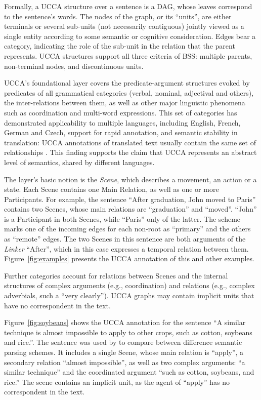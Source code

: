\documentclass[11pt]{article}
\newcommand{\figref}[1]{Figure~\ref{#1}}
\begin{document}
Formally, a UCCA structure over a sentence is a DAG, whose leaves correspond to the sentence's words.
The nodes of the graph, or its ``units'', are either terminals or several
sub-units (not necessarily contiguous) jointly viewed as a
single entity according to some semantic or cognitive consideration.
Edges bear a category, indicating the role of the sub-unit in the relation that the parent represents.
UCCA structures support all three criteria of BSS: multiple parents, non-terminal nodes, and
discontinuous units.

UCCA's foundational layer covers the predicate-argument
structures evoked by predicates of all grammatical categories
(verbal, nominal, adjectival and others), the inter-relations between them,
as well as other major linguistic phenomena such as coordination and multi-word expressions.
This set of categories has demonstrated applicability to multiple languages, including
English, French, German and Czech, support for rapid annotation, and semantic stability in translation:
UCCA annotations of translated text usually contain the same set of relationships
\cite{sulem2015conceptual}. This finding supports the claim that UCCA represents an abstract
level of semantics, shared by different languages.

The layer's basic notion is the {\it Scene}, which describes a movement, an action or a state.
Each Scene contains one Main Relation, as well as one or more Participants.
For example, the sentence ``After graduation, John moved to Paris'' contains two Scenes,
whose main relations are ``graduation'' and ``moved''. ``John'' is a Participant in both Scenes,
while ``Paris'' only of the latter.
The scheme marks one of the incoming edges for each non-root
as ``primary'' and the others as ``remote'' edges.
The two Scenes in this sentence are both arguments of the \textit{Linker} ``After'',
which in this case expresses a temporal relation between them.
\figref{fig:examples} presents the UCCA annotation of this and other examples.

Further categories account for relations between Scenes and the internal structures of
complex arguments (e.g., coordination) and relations
(e.g., complex adverbials, such a ``very clearly''). UCCA graphs may contain implicit
units that have no correspondent in the text.

\figref{fig:soybeans} shows the UCCA annotation for the sentence
``A similar technique is almost impossible to apply to other crops, such as cotton, soybeans and rice.''.
The sentence was used by \cite{oepen2015semeval} to compare between difference semantic parsing schemes.
It includes a single Scene, whose main relation is ``apply'', a secondary relation ``almost impossible'', as well as two complex arguments: ``a similar technique'' and the coordinated argument ``such as cotton, soybeans, and rice.''
The scene contains an implicit unit, as the agent of ``apply'' has no correspondent in the text.
\end{document}
